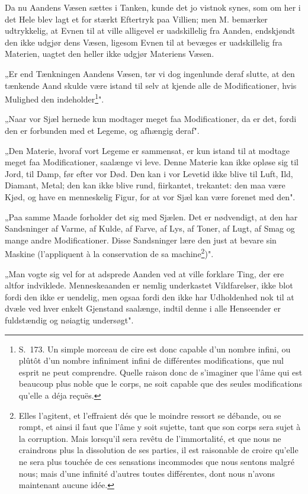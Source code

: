 \documentclass[12pt,a4paper]{article}
\newcommand{\opage}[1]{\marginnote{\footnotesize\textit{[#1]}}}
\begin{document}
Da nu Aandens Væsen sættes i Tanken, kunde det jo vistnok synes, som om her
i det Hele blev lagt et for stærkt Eftertryk paa Villien; men M. bemærker
udtrykkelig, at Evnen til at ville alligevel er uadskillelig fra Aanden,
endskjøndt den ikke udgjør dens Væsen, ligesom Evnen til at bevæges er
uadskillelig fra Materien, uagtet den heller ikke udgjør Materiens Væsen.

„Er end Tænkningen Aandens Væsen, tør vi dog ingenlunde deraf slutte, at den
tænkende Aand skulde være istand til selv at kjende alle de Modificationer, hvis
Mulighed den indeholder\footnote{S.~173. Un simple morceau de cire est donc
capable d'un nombre infini, ou plûtôt d'un nombre infiniment infini de
différentes modifications, que nul esprit ne peut comprendre. Quelle raison donc
de s'imaginer que l'âme qui est beaucoup plus noble que le corps, ne soit
capable que des seules modifications qu'elle a déja reçuës.}".

„Naar vor Sjæl hernede kun modtager meget faa Modificationer, da er det, fordi
den er forbunden med et Legeme, og afhængig deraf".

„Den Materie, hvoraf vort Legeme er sammensat, er kun istand til
\opage{12} at modtage meget faa Modificationer, saalænge vi leve. Denne Materie kan ikke
opløse sig til Jord, til Damp, før efter vor Død. Den kan i vor Levetid ikke
blive til Luft, Ild, Diamant, Metal; den kan ikke blive rund, fiirkantet,
trekantet: den maa være Kjød, og have en menneskelig Figur, for at vor Sjæl
kan være forenet med den".

„Paa samme Maade forholder det sig med Sjælen. Det er nødvendigt, at den har
Sandsninger af Varme, af Kulde, af Farve, af Lys, af Toner, af Lugt, af Smag og
mange andre Modificationer. Disse Sandsninger lære den just at bevare sin
Maskine (l'appliquent à la conservation de sa machine\footnote{Elles l'agitent,
et l'effraient dés que le moindre ressort se débande, ou se rompt, et ainsi il
faut que l'âme y soit sujette, tant que son corps sera sujet à la corruption.
Mais lorsqu'il sera revêtu de l'immortalité, et que nous ne craindrons plus la
dissolution de ses parties, il est raisonable de croire qu'elle ne sera plus
touchée de ces sensations incommodes que nous sentons malgré nous; mais d'une
infinité d'autres toutes différentes, dont nous n'avons maintenant aucune
idée.})".

„Man vogte sig vel for at adsprede Aanden ved at ville forklare Ting, der ere
altfor indviklede. Menneskeaanden er nemlig underkastet Vildfarelser, ikke blot
fordi den ikke er uendelig, men ogsaa fordi den ikke har Udholdenhed nok til at
dvæle ved hver enkelt Gjenstand saalænge, indtil denne i alle Henseender er
fuldstændig og nøiagtig undersøgt".
\end{document}
